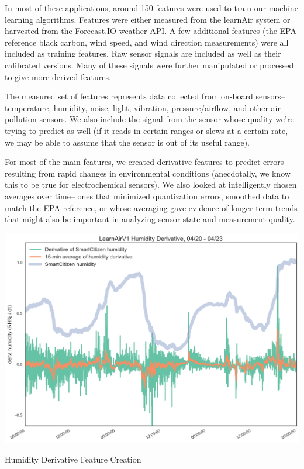 In most of these applications, around 150 features were used to train our machine learning algorithms.  Features were either measured from the learnAir system or harvested from the Forecast.IO weather API.  A few additional features (the EPA reference black carbon, wind speed, and wind direction measurements) were all included as training features.  Raw sensor signals are included as well as their calibrated versions.  Many of these signals were further manipulated or processed to give more derived features.  

The measured set of features represents data collected from on-board sensors-- temperature, humidity, noise, light, vibration, pressure/airflow, and other air pollution sensors.  We also include the signal from the sensor whose quality we're trying to predict as well (if it reads in certain ranges or slews at a certain rate, we may be able to assume that the sensor is out of its useful range).  

For most of the main features, we created derivative features to predict errors resulting from rapid changes in environmental conditions (anecdotally, we know this to be true for electrochemical sensors).  We also looked at intelligently chosen averages over time-- ones that minimized quantization errors, smoothed data to match the EPA reference, or whose averaging gave evidence of longer term trends that might also be important in analyzing sensor state and measurement quality.

\begin{marginfigure}
 	\includegraphics[width=\textwidth]{figs/humidity_derivative}               
 	 \caption{Humidity Derivative Feature Creation}
  	\label{fig:humidity_derivative}
\end{marginfigure}

